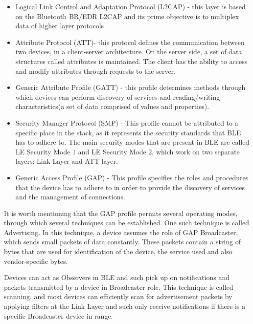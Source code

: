 \begin{itemize}

\item{Logical Link Control and Adaptation Protocol (L2CAP) - this layer is based on the Bluetooth BR/EDR L2CAP and its prime objective is to multiplex data of higher layer protocols}

\item{Attribute Protocol (ATT)- this protocol defines the communication between two devices, in a client-server architecture. On the server side, a set of data structures called attributes is maintained. The client has the ability to access and modify attributes through requests to the server.}

\item{Generic Attribute Profile (GATT) - this profile determines methods through which devices can perform discovery of services and reading/writing characteristics(a set of data comprised of values and properties).}

\item{Security Manager Protocol (SMP) - This profile cannot be attributed to a specific place in the stack, as it represents the security standards that BLE has to adhere to. The main security modes that are present in BLE are called LE Security Mode 1 and LE Security Mode 2, which work on two separate layers: Link Layer and ATT layer.}

\item{Generic Access Profile (GAP) - This profile specifies the roles and procedures that the device has to adhere to in order to provide the discovery of services and the management of connections.}

\end{itemize}

It is worth mentioning that the GAP profile permits several operating modes, through which several techniques can be established. One such technique is called Advertising. In this technique, a device assumes the role of GAP Broadcaster, which sends small packets of data constantly. These packets contain a string of bytes that are used for identification of the device, the service used and also vendor-specific bytes.

Devices can act as Observers in BLE and such pick up on notifications and packets transmitted by a device in Broadcaster role. This technique is called scanning, and most devices can efficiently scan for advertisement packets by applying filters at the Link Layer and such only receive notifications if there is a specific Broadcaster device in range.

